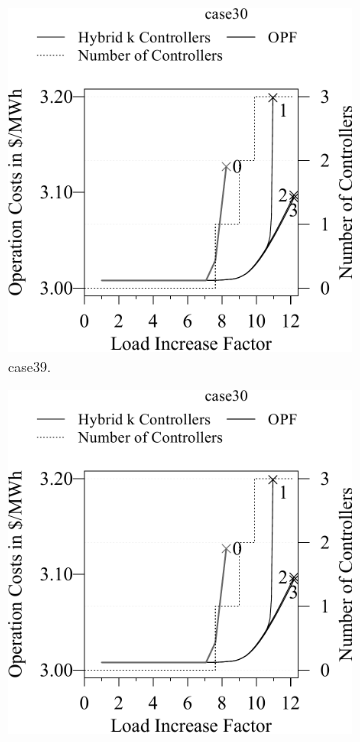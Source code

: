 \begin{figure}[t!]
\begin{subfigure}[t]{.45\textwidth}
    \centering
        \includegraphics[width=0.95\linewidth, page=2]{factsplacement/plots/plotCapacityReductionVsCostsController.pdf}
  \caption{case39.}
    \label{ch:appendix:sec:facts:fig:plot-capacity-cost-controller-case39}
\end{subfigure}
\hfill
\begin{subfigure}[t]{.45\textwidth}
    \centering
        \includegraphics[width=0.95\linewidth, page=6]{factsplacement/plots/plotCapacityReductionVsCostsController.pdf}

\end{subfigure}
\end{figure}
